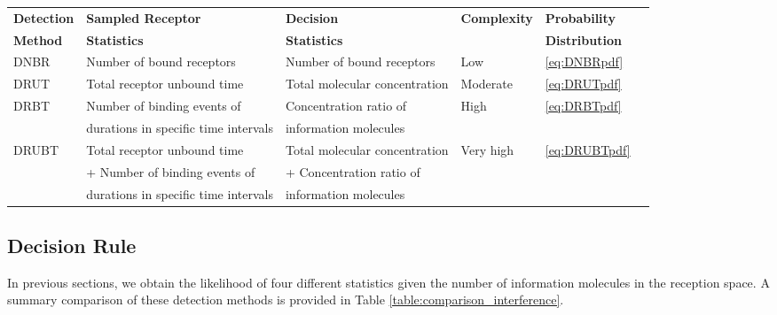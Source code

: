 \documentclass[twocolumn]{IEEEtran}
\begin{document}
\begin{table*}[!t]\scriptsize
	\centering
	\begin{threeparttable}
		\centering
		\caption[Comparison of detection methods under interference]{Comparison of Detection Methods}
		\label{table:comparison_interference}
		\begin{tabular}{llllll}
			\toprule	
			\textbf{Detection}   & \textbf{Sampled Receptor} & \textbf{Decision} & \textbf{Complexity}&  \textbf{Probability} \\ 
			\textbf{Method}   & \textbf{Statistics} & \textbf{Statistics} & &  \textbf{Distribution} \\
			\toprule
			DNBR  & Number of bound receptors & Number of bound receptors   & Low &  \eqref{eq:DNBRpdf}  \\ \midrule
			DRUT   & Total receptor unbound time & Total molecular concentration & Moderate & \eqref{eq:DRUTpdf} \\ \midrule
			DRBT         & Number of binding events of  & Concentration ratio of& High    &  \eqref{eq:DRBTpdf}    \\ 
			& durations in specific time intervals      & information molecules  &    &     \\ \midrule
			DRUBT &  Total receptor unbound time   & Total molecular concentration       & Very high &    \eqref{eq:DRUBTpdf} \\
			& + Number of binding events of   &  + Concentration ratio of& & \\
			&durations in specific time intervals    & information molecules & & \\  
			\bottomrule
		\end{tabular}%
	\end{threeparttable}	
\end{table*}%


\subsection{Decision Rule} 
\label{sec:detectionrule}
In previous sections, we obtain the likelihood of four different statistics given the number of information molecules in the reception space. A summary comparison of these detection methods is provided in Table \ref{table:comparison_interference}.
\end{document}
